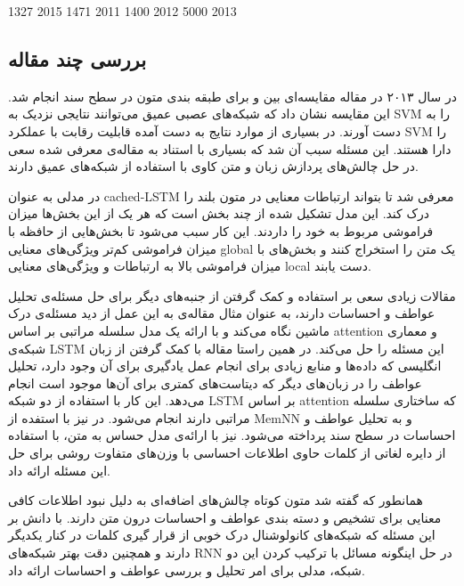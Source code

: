 \documentclass[12pt, a4paper, oneside]{report}
\begin{document}
\cite{tang-etal-2015-document} 1327 2015
\cite{socher-etal-2011-semi} 1471 2011
\cite{socher-etal-2012-semantic} 1400 2012
\cite{socher-etal-2013-recursive} 5000 2013




\subsection{بررسی چند مقاله}

در سال ۲۰۱۳ در مقاله
\cite{Moraes2013DocumentlevelSC}
مقایسه‌ای بین
و
برای طبقه بندی متون در سطح سند انجام شد. این مقایسه نشان داد که شبکه‌‌های عصبی عمیق می‌توانند نتایجی نزدیک به
SVM
را به دست آورند. در بسیاری از موارد نتایج به دست آمده قابلیت رقابت با عملکرد‌
SVM
را دارا هستند. این مسئله سبب آن شد که بسیاری با استناد به مقاله‌ی معرفی شده سعی در حل چالش‌های پردازش زبان و متن کاوی
با استفاده از شبکه‌های عمیق دارند.

در
\cite{xu2016cached}
مدلی به عنوان
cached-LSTM
معرفی شد تا بتواند ارتباطات معنایی در متون بلند را درک کند. این مدل تشکیل شده از چند بخش است که هر یک از این
بخش‌ها میزان فراموشی مربوط به خود را داردند. این کار سبب می‌شود تا بخش‌هایی از حافظه با میزان فراموشی کم‌تر ویژگی‌های
معنایی
global
یک متن را استخراج کنند و بخش‌های با میزان فراموشی بالا به ارتباطات و ویژگی‌های معنایی
local
دست یابند.

مقالات زیادی سعی بر استفاده و کمک گرفتن از جنبه‌های دیگر برای حل مسئله‌ی تحلیل عواطف و احساسات دارند،
به عنوان مثال مقاله‌ی
\cite{yin-etal-2017-document}
به این عمل از دید مسئله‌ی درک ماشین نگاه می‌کند و با ارائه یک مدل سلسله مراتبی بر اساس
attention
و معماری شبکه‌ی
LSTM
این مسئله را حل می‌کند.
در همین راستا مقاله
\cite{zhou-etal-2016-attention}
با کمک گرفتن از زبان انگلیسی که داده‌ها و منابع زیادی برای انجام عمل یادگیری برای آن وجود دارد، تحلیل
عواطف را در زبان‌های دیگر که دیتاست‌های کمتری برای آن‌ها موجود است انجام می‌دهد. این کار با استفاده از دو شبکه
LSTM
بر اساس
attention
که ساختاری سلسله مراتبی دارند انجام می‌شود.
در
\cite{ijcai2017-311}
نیز با استفده از
MemNN
و
به تحلیل عواطف و احساسات در سطح سند پرداخته می‌شود.
\cite{teng-etal-2016-context}
نیز با ارائه‌ی مدل
حساس به متن، با استفاده از دایره لغاتی از کلمات حاوی اطلاعات احساسی با وزن‌های متفاوت روشی برای حل این مسئله ارائه داد.

همانطور که گفته شد متون کوتاه چالش‌های اضافه‌ای به دلیل نبود اطلاعات کافی معنایی برای تشخیص و دسته بندی عواطف
و احساسات درون متن دارند.
\cite{wang-etal-2016-combination}
با دانش بر این مسئله که شبکه‌های کانولوشنال درک خوبی از قرار گیری کلمات در کنار یکدیگر دارند و همچنین دقت
بهتر شبکه‌های
RNN
در حل اینگونه مسائل با ترکیب کردن این دو شبکه، مدلی برای امر تحلیل و بررسی عواطف و احساسات ارائه داد.
\end{document}
